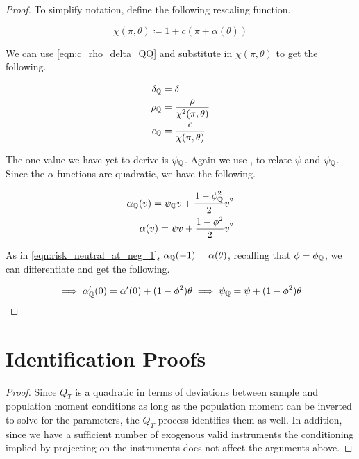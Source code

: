 \documentclass[11pt, letterpaper, twoside, final]{article}
\begin{document}
\begin{appendices}
\begin{proof}
To simplify notation, define the following rescaling function.

\begin{equation}
    \chi(\pi, \theta) \coloneqq 1 + c(\pi + \alpha(\theta))
\end{equation}

We can use \cref{eqn:c_rho_delta_QQ} and substitute in $\chi(\pi, \theta)$ to get the following.

\begin{align}
    \delta_{\mathbb{Q}} &= \delta \\
    \rho_{\mathbb{Q}} &= \frac{\rho}{\chi^2(\pi, \theta)} \\
    c_{\mathbb{Q}} &= \frac{c}{\chi(\pi, \theta)} 
\end{align}

The one value we have yet to derive is $\psi_{\mathbb{Q}}$.
Again we use \textcite[Proposition 5]{khrapov2016affine}, to relate $\psi$ and $\psi_{\mathbb{Q}}$. 
Since the $\alpha$ functions are quadratic, we have the following.

\begin{align}
    \alpha_{\QQ}(v) = \psi_{\QQ} v + \frac{1- \phi^2_{\QQ}}{2} v^2  \\
%
    \alpha(v) = \psi v + \frac{1- \phi^2}{2} v^2  
\end{align}

As in \cref{eqn:risk_neutral_at_neg_1}, $\alpha_{\mathbb{Q}}(-1) = \alpha(\theta)$, recalling that $\phi =
\phi_{\mathbb{Q}}$, we can differentiate and get the following.

\begin{align}
    \implies \alpha_{\QQ}'(0) = \alpha'(0) + (1 - \phi^2) \theta
%
    \implies \psi_{\QQ} = \psi + (1 - \phi^2) \theta
\end{align}

\end{proof}

\section{Identification Proofs}


\identifiedSet*

\begin{proof}
    Since $Q_{T}$ is a quadratic in terms of deviations between sample and population moment conditions as long as
    the population moment can be inverted to solve for the parameters, the $Q_T$ process identifies them as well. 
    In addition, since we have a sufficient number of exogenous valid instruments the conditioning implied by
    projecting on the instruments does not affect the arguments above. 


\end{proof}
\end{appendices}
\end{document}

